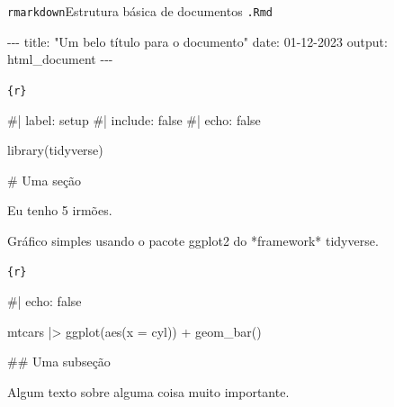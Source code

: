 \documentclass[
  10pt,
  ignorenonframetext,
]{beamer}
\newenvironment{Shaded}{\begin{snugshade}}{\end{snugshade}}
\newcommand{\NormalTok}[1]{\textcolor[rgb]{0.00,0.23,0.31}{#1}}
\begin{document}
\begin{frame}[fragile]{\texttt{rmarkdown}\newline Estrutura básica de
documentos \texttt{.Rmd}}
\protect\hypertarget{rmarkdownestrutura-buxe1sica-de-documentos-.rmd}{}
\tiny

\begin{Shaded}
\begin{Highlighting}[]
\NormalTok{{-}{-}{-}}
\NormalTok{title: "Um belo título para o documento"}
\NormalTok{date: 01{-}12{-}2023}
\NormalTok{output: html\_document}
\NormalTok{{-}{-}{-}}
\end{Highlighting}
\end{Shaded}

\texttt{\textasciigrave{}\textasciigrave{}\textasciigrave{}\{r\}}

\begin{Shaded}
\begin{Highlighting}[]
\NormalTok{\#| label: setup}
\NormalTok{\#| include: false}
\NormalTok{\#| echo: false}

\NormalTok{library(tidyverse)}
\end{Highlighting}
\end{Shaded}

\texttt{\textasciigrave{}\textasciigrave{}\textasciigrave{}}

\begin{Shaded}
\begin{Highlighting}[]
\NormalTok{\# Uma seção}

\NormalTok{Eu tenho 5 irmões.}

\NormalTok{Gráfico simples usando o pacote \textasciigrave{}ggplot2\textasciigrave{} do *framework* \textasciigrave{}tidyverse\textasciigrave{}.}
\end{Highlighting}
\end{Shaded}

\texttt{\textasciigrave{}\textasciigrave{}\textasciigrave{}\{r\}}

\begin{Shaded}
\begin{Highlighting}[]
\NormalTok{\#| echo: false}

\NormalTok{mtcars |\textgreater{}}
\NormalTok{  ggplot(aes(x = cyl)) +}
\NormalTok{  geom\_bar()}
\end{Highlighting}
\end{Shaded}

\texttt{\textasciigrave{}\textasciigrave{}\textasciigrave{}}

\begin{Shaded}
\begin{Highlighting}[]
\NormalTok{\#\# Uma subseção}

\NormalTok{Algum texto sobre alguma coisa muito importante.}
\end{Highlighting}
\end{Shaded}

\normalsize
\end{frame}
\end{document}
